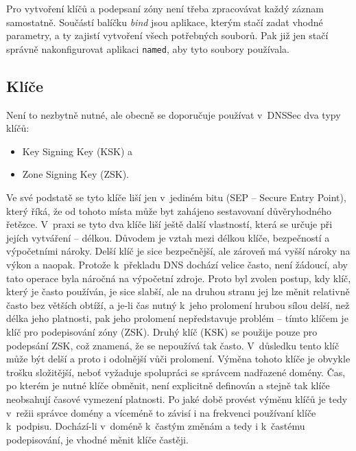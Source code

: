 Pro vytvoření klíčů a podepsaní zóny není třeba zpracovávat každý záznam samostatně. Součástí balíčku {\em bind} jsou aplikace, kterým stačí zadat vhodné parametry, a ty zajistí vytvoření všech potřebných souborů. Pak již jen stačí správně nakonfigurovat aplikaci {\tt named}, aby tyto soubory používala.

\subsection{Klíče}
Není to nezbytně nutné, ale obecně se doporučuje používat v~DNSSec dva typy klíčů:
\begin{itemize}
  \item Key Signing Key (KSK) a
  \item Zone Signing Key (ZSK).
\end{itemize}
Ve své podstatě se tyto klíče liší jen v~jediném bitu (SEP -- Secure Entry
Point), který říká, že od tohoto místa může byt zahájeno sestavovaní
důvěryhodného řetězce. V~praxi se tyto dva klíče liší ještě další vlastností,
která se určuje při jejích vytváření -- délkou. Důvodem je vztah mezi délkou
klíče, bezpečností a výpočetními nároky. Delší klíč je sice bezpečnější, ale
zároveň má vyšší nároky na výkon a naopak. Protože k~překladu DNS dochází velice
často, není žádoucí, aby tato operace byla náročná na výpočetní zdroje. Proto
byl zvolen postup, kdy klíč, který je často používán, je sice slabší, ale na
druhou stranu jej lze měnit relativně často bez větších obtíží, a je-li čas
nutný k~jeho prolomení hrubou sílou delší, než délka jeho platnosti, pak jeho prolomení nepředstavuje problém -- tímto klíčem je klíč pro podepisování zóny (ZSK). Druhý klíč (KSK) se použije pouze pro podepsání ZSK, což znamená, že se nepoužívá tak často. V~důsledku tento klíč může být delší a proto i odolnější vůči prolomení. Výměna tohoto klíče je obvykle trošku složitější, neboť vyžaduje spolupráci se správcem nadřazené domény. Čas, po kterém je nutné klíče obměnit, není explicitně definován a stejně tak klíče neobsahují časové vymezení platnosti. Po jaké době provést výměnu klíčů je tedy v~režii správce domény a víceméně to závisí i na frekvenci používaní klíče k~podpisu. Dochází-li v~doméně k~častým změnám a tedy i k~častému podepisování, je vhodné měnit klíče častěji.

